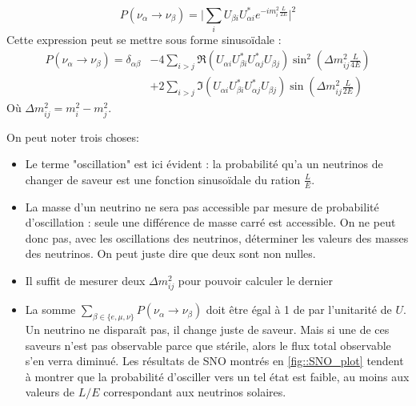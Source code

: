             \begin{equation*}
                P(\nu_{\alpha}\to\nu_{\beta}) = \bigg|\sum_i U_{\beta i}U_{\alpha i}^* e^{-im_i^2\frac{L}{2E}}\bigg|^2
            \end{equation*}
            Cette expression peut se mettre sous forme sinusoïdale\cite{Mondal2015} :
            \begin{equation}\label{eq::proba_oscillation}
                \begin{split}
                    P(\nu_{\alpha}\to\nu_{\beta}) = \delta_{\alpha\beta} & - 4\sum_{i>j}\Re(U_{\alpha i}U_{\beta i}^*U_{\alpha j}^*U_{\beta j})\sin^2\left(\Delta m_{ij}^2\frac{L}{4E}\right) \\
                    & +2\sum_{i>j}\Im(U_{\alpha i}U_{\beta i}^*U_{\alpha j}^*U_{\beta j})\sin\left(\Delta m_{ij}^2\frac{L}{2E}\right)
                \end{split}
            \end{equation}
            Où $\Delta m_{ij}^2 = m_i^2-m_j^2$.
            
            On peut noter trois choses:
            \begin{itemize}
                \item Le terme "oscillation" est ici évident : la probabilité qu'a un neutrinos de changer de saveur est une fonction sinusoïdale du ration $\frac{L}{E}$. 
                \item La masse d'un neutrino ne sera pas accessible par mesure de probabilité d'oscillation : seule une différence de masse carré est accessible. On ne peut donc pas, avec les oscillations des neutrinos, déterminer les valeurs des masses des neutrinos. On peut juste dire que deux sont non nulles.
                \item Il suffit de mesurer deux $\Delta m_{ij}^2$ pour pouvoir calculer le dernier
                \item La somme $\sum_{\beta\in\{e,\mu,\nu\}}P(\nu_{\alpha}\to\nu_{\beta})$ doit être égal à 1 de par l'unitarité de $U$. Un neutrino ne disparaît pas, il change juste de saveur. Mais si une de ces saveurs n'est pas observable parce que stérile, alors le flux total observable s'en verra diminué. Les résultats de SNO montrés en \autoref{fig::SNO_plot} tendent à montrer que la probabilité d'osciller vers un tel état est faible, au moins aux valeurs de $L/E$ correspondant aux neutrinos solaires.
            \end{itemize}
            
